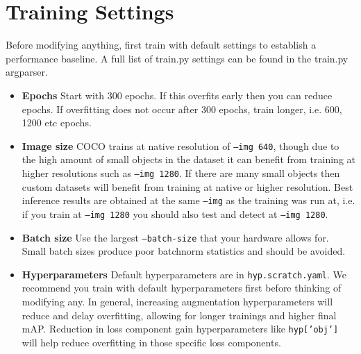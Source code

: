 \section{Training Settings}
Before modifying anything, first train with default settings to establish a performance baseline. A full list of train.py settings can be found in the train.py argparser.
\begin{itemize}
  \item \textbf{Epochs} Start with 300 epochs. If this overfits early then you can reduce epochs. If overfitting does not occur after 300 epochs, train longer, i.e. 600, 1200 etc epochs.
  \item \textbf{Image size} COCO trains at native resolution of \texttt{--img 640}, though due to the high amount of small objects in the dataset it can benefit from training at higher resolutions such as \texttt{--img 1280}. If there are many small objects then custom datasets will benefit from training at native or higher resolution. Best inference results are obtained at the same \texttt{--img} as the training was run at, i.e. if you train at \texttt{--img 1280} you should also test and detect at \texttt{--img 1280}.
  \item \textbf{Batch size} Use the largest \texttt{--batch-size} that your hardware allows for. Small batch sizes produce poor batchnorm statistics and should be avoided.
  \item \textbf{Hyperparameters} Default hyperparameters are in \texttt{hyp.scratch.yaml}. We recommend you train with default hyperparameters first before thinking of modifying any. In general, increasing augmentation hyperparameters will reduce and delay overfitting, allowing for longer trainings and higher final mAP. Reduction in loss component gain hyperparameters like \texttt{hyp['obj']} will help reduce overfitting in those specific loss components.
\end{itemize}



{}
\specialsection %
\headerspecialsection

{\hypersetup{urlcolor=ntnu,linkcolor=sophia} %

  
}
